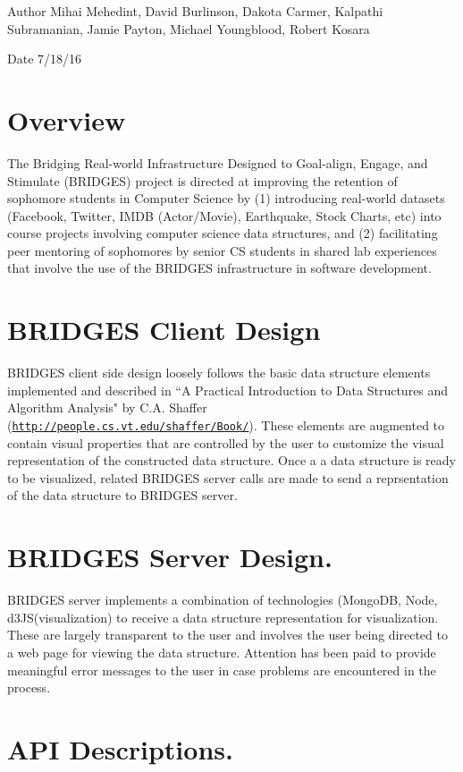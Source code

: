 \begin{DoxyAuthor}{Author}
Mihai Mehedint, David Burlinson, Dakota Carmer, Kalpathi Subramanian, Jamie Payton, Michael Youngblood, Robert Kosara 
\end{DoxyAuthor}
\begin{DoxyDate}{Date}
7/18/16
\end{DoxyDate}
\hypertarget{index_overview_sec}{}\section{Overview}\label{index_overview_sec}
The Bridging Real-\/world Infrastructure Designed to Goal-\/align, Engage, and Stimulate (B\+R\+I\+D\+G\+E\+S) project is directed at improving the retention of sophomore students in Computer Science by (1) introducing real-\/world datasets (Facebook, Twitter, I\+M\+D\+B (Actor/\+Movie), Earthquake, Stock Charts, etc) into course projects involving computer science data structures, and (2) facilitating peer mentoring of sophomores by senior C\+S students in shared lab experiences that involve the use of the B\+R\+I\+D\+G\+E\+S infrastructure in software development. \hypertarget{index_br_client}{}\section{B\+R\+I\+D\+G\+E\+S Client Design}\label{index_br_client}
B\+R\+I\+D\+G\+E\+S client side design loosely follows the basic data structure elements implemented and described in ``\+A Practical Introduction to Data Structures and Algorithm Analysis" by C.\+A. Shaffer (\href{http://people.cs.vt.edu/shaffer/Book/}{\tt http\+://people.\+cs.\+vt.\+edu/shaffer/\+Book/}). These elements are augmented to contain visual properties that are controlled by the user to customize the visual representation of the constructed data structure. Once a a data structure is ready to be visualized, related B\+R\+I\+D\+G\+E\+S server calls are made to send a reprsentation of the data structure to B\+R\+I\+D\+G\+E\+S server. \hypertarget{index_br_server}{}\section{B\+R\+I\+D\+G\+E\+S Server Design.}\label{index_br_server}
B\+R\+I\+D\+G\+E\+S server implements a combination of technologies (Mongo\+D\+B, Node, d3\+J\+S(visualization) to receive a data structure representation for visualization. These are largely transparent to the user and involves the user being directed to a web page for viewing the data structure. Attention has been paid to provide meaningful error messages to the user in case problems are encountered in the process. \hypertarget{index_api_sec}{}\section{A\+P\+I Descriptions.}\label{index_api_sec}
